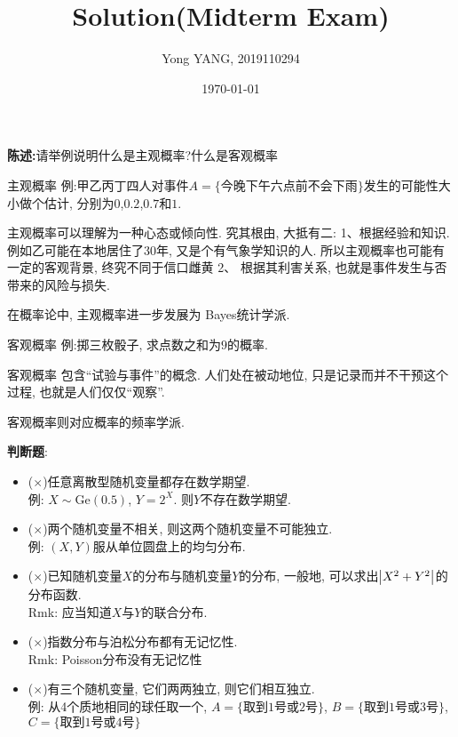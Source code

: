 \documentclass[aspectratio=43]{beamer}
\title{Solution(Midterm Exam)} %
\author[Yong YANG]{Yong YANG, 2019110294}
\institute[BUPT]{
	Beijing University of Posts and Telecommunications%
} %
\date{\today}
\begin{document}
	
	\frame{\titlepage}
	
   \section{}
\begin{frame}{\textbf{陈述:}请举例说明什么是主观概率?什么是客观概率}
\begin{block}{主观概率}
	例:甲乙丙丁四人对事件$A = \{\text{今晚下午六点前不会下雨} \}$发生的可能性大小做个估计, 分别为$0$,$0.2$,$0.7$和$1$.
	
	主观概率可以理解为一种心态或倾向性. 究其根由, 大抵有二: 1、根据经验和知识. 例如乙可能在本地居住了30年, 又是个有气象学知识的人. 所以主观概率也可能有一定的客观背景, 终究不同于信口雌黄 2、 根据其利害关系, 也就是事件发生与否带来的风险与损失.
	
	在概率论中, 主观概率进一步发展为 Bayes统计学派.
\end{block}
\begin{block}{客观概率}
	例:掷三枚骰子, 求点数之和为$9$的概率.
	
	客观概率 包含“试验与事件”的概念. 人们处在被动地位, 只是记录而并不干预这个过程, 也就是人们仅仅“观察”. 
	
	客观概率则对应概率的频率学派.
\end{block}
\end{frame}

\begin{frame}{\textbf{判断题}:}

\begin{itemize}
	\item ($\times$)任意离散型随机变量都存在数学期望.\\
	例: $X\sim \mathrm{Ge}(0.5)$, $Y = 2^X$. 则$Y$不存在数学期望.
	\item ($\times$)两个随机变量不相关, 则这两个随机变量不可能独立.\\
	例: $(X,Y)$服从单位圆盘上的均匀分布.
	\item ($\times$)已知随机变量$X$的分布与随机变量$Y$的分布, 一般地, 可以求出$\abs{X^2+Y^2}$的分布函数.\\
	Rmk: 应当知道$X$与$Y$的联合分布.
	\item ($\times$)指数分布与泊松分布都有无记忆性.\\
	Rmk: Poisson分布没有无记忆性
	\item ($\times$)有三个随机变量, 它们两两独立, 则它们相互独立.\\
	例: 从4个质地相同的球任取一个, $A = \{\text{取到1号或2号}\}$, $B = \{\text{取到1号或3号}\}$, $C = \{\text{取到1号或4号}\}$
\end{itemize}

\end{frame}
\end{document}
